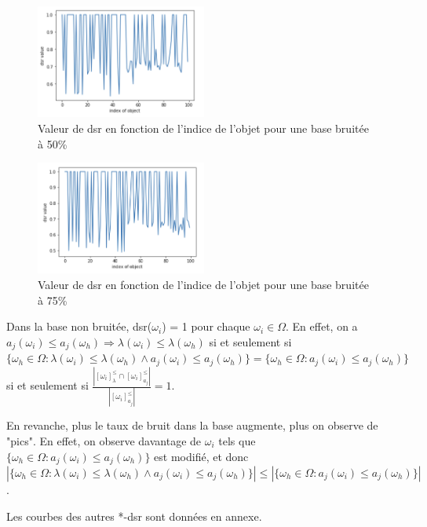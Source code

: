 \documentclass[a4paper]{article}
\begin{document}
\begin{figure}[H]
	\center 
	\includegraphics[width=0.5\textwidth]{images/dsr_50.png}
    \caption{Valeur de dsr en fonction de l'indice de l'objet pour une base
    bruitée à 50\%}
    \label{img:dsr50}
\end{figure}

\begin{figure}[H]
	\center 
	\includegraphics[width=0.5\textwidth]{images/dsr_75.png}
    \caption{Valeur de dsr en fonction de l'indice de l'objet pour une base
    bruitée à 75\%}
    \label{img:dsr75}
\end{figure}


Dans la base non bruitée, dsr($\omega_i$) = 1 pour chaque $\omega_i \in \Omega$.
En effet, on a $a_j(\omega_i) \leq a_j(\omega_h) \Rightarrow \lambda(\omega_i)
\leq \lambda(\omega_h)$ si et seulement si $\{\omega_h \in \Omega :
\lambda(\omega_i) \leq \lambda(\omega_h) \land a_j(\omega_i) \leq
a_j(\omega_h)\} = \{\omega_h \in \Omega : a_j(\omega_i) \leq a_j(\omega_h)\}$ si
et seulement si $\frac{| [\omega_i]^{\leq}_{\lambda} \cap
[\omega_i]^{\leq}_{a_j}|}{| [\omega_i]^{\leq}_{a_j} |} = 1 $.

\noindent En revanche, plus le taux de bruit dans la base augmente, plus on observe de
"pics". En effet, on observe davantage de $\omega_i$ tels que $ \{\omega_h \in
\Omega : a_j(\omega_i) \leq a_j(\omega_h)\} $ est modifié, et donc  $|
\{\omega_h \in \Omega : \lambda(\omega_i) \leq \lambda(\omega_h) \land
a_j(\omega_i) \leq a_j(\omega_h)\} | \leq | \{\omega_h \in \Omega :
a_j(\omega_i) \leq a_j(\omega_h)\} |$.

\noindent Les courbes des autres *-dsr sont données en annexe.\\
\end{document}
